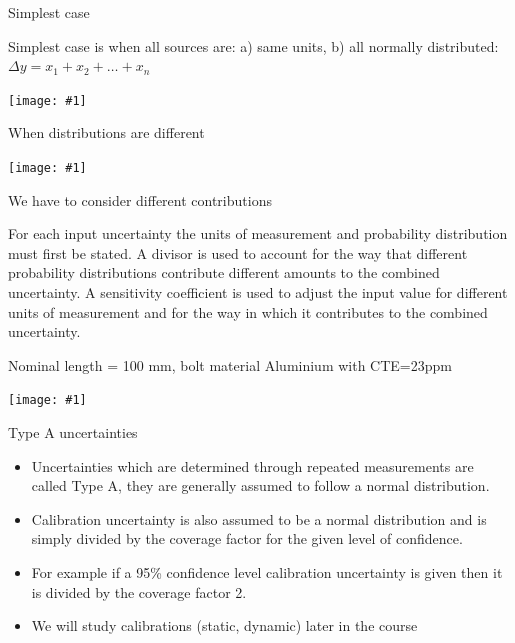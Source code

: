 \documentclass[12pt]{beamer}
\newcommand{\fig}[1]{\centering\texttt{[image: \#1]}}
\begin{document}
\begin{frame}{Simplest case}

Simplest case is when all sources are: a) same units, b) all normally distributed: $\Delta y = x_1 + x_2 + \ldots + x_n$

\fig{uncertainty-budget-1b.png}

\end{frame}


\begin{frame}{When distributions are different}

\fig{central-limit-theorem.png}
\end{frame}

\begin{frame}{We have to consider different contributions}

For each input uncertainty the units of measurement and probability distribution must first be stated. A divisor is used to account for the way that different probability distributions contribute different amounts to the combined uncertainty. A sensitivity coefficient is used to adjust the input value for different units of measurement and for the way in which it contributes to the combined uncertainty.

\end{frame}

\begin{frame}

Nominal length = 100 mm, bolt material Aluminium with CTE=23ppm


\fig{full-uncertainty-budget}
\end{frame}

\begin{frame}{Type A uncertainties}
\begin{itemize}
\item Uncertainties which are determined through repeated measurements are called Type A, they are generally assumed to follow a normal distribution.
\item Calibration uncertainty is also assumed to be a normal distribution and is simply divided by the coverage factor for the given level of confidence.
\item For example if a 95\% confidence level calibration uncertainty is given then it is divided by the coverage factor 2.
\item We will study calibrations (static, dynamic) later in the course
\end{itemize}
  
\end{frame}
\end{document}

